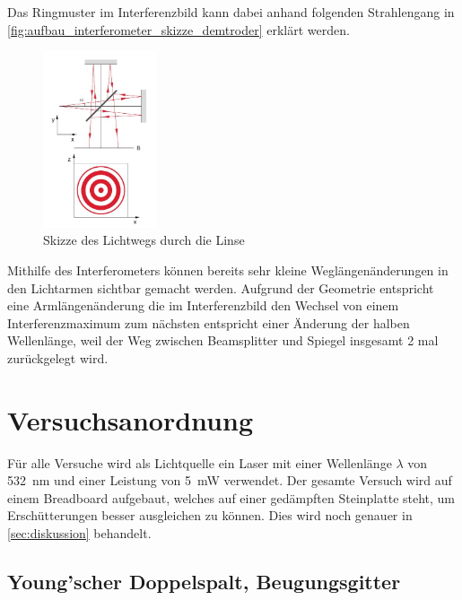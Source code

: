 \documentclass[12pt,english,ngerman]{scrartcl}
\begin{document}
Das Ringmuster im Interferenzbild kann dabei anhand folgenden Strahlengang in \autoref{fig:aufbau_interferometer_skizze_demtroder}
erklärt werden.\cite{unterlagen}

\begin{figure}[H]
	\begin{center}
		\includegraphics[width =0.3\textwidth]{./figures/linse_demtroder.jpg}
	\end{center}
	\caption[Skizze des Lichtwegs durch die Linse] 
  {Skizze des Lichtwegs durch die Linse \cite{demtroder2}
	}\label{fig:aufbau_interferometer_skizze_demtroder}
\end{figure}

Mithilfe des Interferometers können bereits sehr kleine Weglängenänderungen in den Lichtarmen sichtbar gemacht werden.
Aufgrund der Geometrie entspricht eine Armlängenänderung die im Interferenzbild den Wechsel von einem Interferenzmaximum
zum nächsten entspricht einer Änderung der halben Wellenlänge, weil der Weg zwischen Beamsplitter und Spiegel insgesamt 
2 mal zurückgelegt wird.

\section{Versuchsanordnung}\label{sec:versuchsanordnung}

Für alle Versuche wird als Lichtquelle ein Laser mit einer Wellenlänge $\lambda$ von \SI{532}{\nano\meter} und einer 
Leistung von \SI{5}{\milli\watt} verwendet. Der gesamte Versuch wird auf einem Breadboard aufgebaut, welches auf einer 
gedämpften Steinplatte steht, um Erschütterungen besser ausgleichen zu können. Dies wird noch genauer in \autoref{sec:diskussion}
behandelt.
\subsection{Young'scher Doppelspalt, Beugungsgitter}
\end{document}
